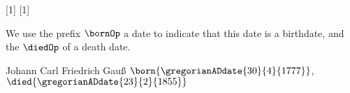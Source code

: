 \documentclass[notes,mh]{mikoslides}
\begin{document}
\begin{module}[id=dates]
[1]{\mixfixi[nobrackets]}
[1]{\mixfixi[nobrackets]}

\begin{definition}[for={born,died},id=borndied.def]
  We use the prefix $\bornOp$ a date to indicate that this date is a birthdate, and the
  $\diedOp$ of a death date.
\end{definition}

\begin{example}[for=borndied.def]
  Johann Carl Friedrich Gau{\ss} $\born{\gregorianADdate{30}{4}{1777}}$,
  $\died{\gregorianADdate{23}{2}{1855}}$
\end{example}
\end{module}
\end{document}
